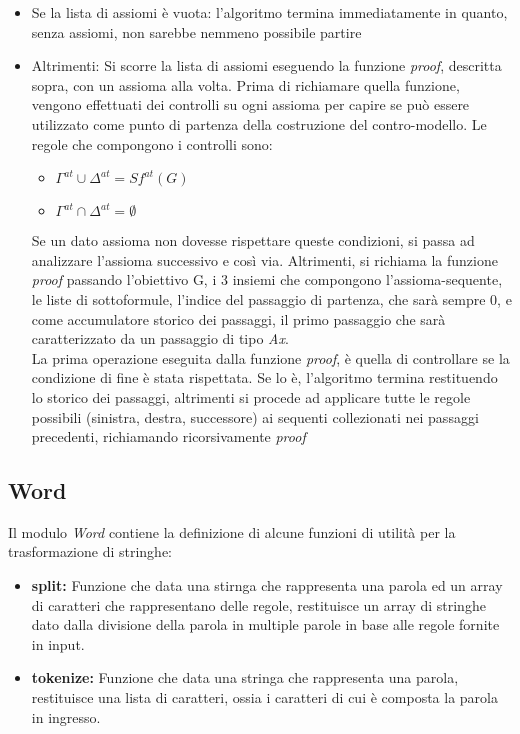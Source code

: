 \documentclass[\main/tesi.tex]{subfiles}
\begin{document}
\begin{itemize}
    \item Se la lista di assiomi è vuota: l'algoritmo termina immediatamente in quanto, senza assiomi, non sarebbe nemmeno possibile partire
    \item Altrimenti: Si scorre la lista di assiomi eseguendo la funzione \textit{proof}, descritta sopra, con un assioma alla volta. Prima di richiamare quella funzione, vengono effettuati dei controlli su ogni assioma per capire se può essere utilizzato come punto di partenza della costruzione del contro-modello. Le regole che compongono i controlli sono:
          \begin{itemize}
              \item $\Gamma^{at} \cup \Delta^{at} = Sf^{at}(G)$
              \item $\Gamma^{at} \cap \Delta^{at} = \emptyset$
          \end{itemize}
          Se un dato assioma non dovesse rispettare queste condizioni, si passa ad analizzare l'assioma successivo e così via. Altrimenti, si richiama la funzione \textit{proof} passando l'obiettivo G, i 3 insiemi che compongono l'assioma-sequente, le liste di sottoformule, l'indice del passaggio di partenza, che sarà sempre 0, e come accumulatore storico dei passaggi, il primo passaggio che sarà caratterizzato da un passaggio di tipo \textit{Ax}. \\
          La prima operazione eseguita dalla funzione \textit{proof}, è quella di controllare se la condizione di fine è stata rispettata. Se lo è, l'algoritmo termina restituendo lo storico dei passaggi, altrimenti si procede ad applicare tutte le regole possibili (sinistra, destra, successore) ai sequenti collezionati nei passaggi precedenti, richiamando ricorsivamente \textit{proof}
\end{itemize}

\subsection{Word}
Il modulo \textit{Word} contiene la definizione di alcune funzioni di utilità per la trasformazione di stringhe:
\begin{itemize}
    \item \textbf{split:} Funzione che data una stirnga che rappresenta una parola ed un array di caratteri che rappresentano delle regole, restituisce un array di stringhe dato dalla divisione della parola in multiple parole in base alle regole fornite in input.
    \item \textbf{tokenize:} Funzione che data una stringa che rappresenta una parola, restituisce una lista di caratteri, ossia i caratteri di cui è composta la parola in ingresso.
\end{itemize}
\end{document}
